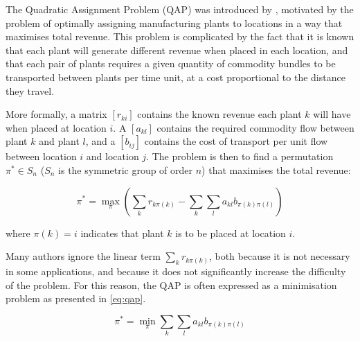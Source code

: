 
%


The Quadratic Assignment Problem (QAP) was introduced by \citet{Koopmans:1957gf}, motivated by the problem of optimally assigning manufacturing plants to locations in a way that maximises total revenue.
This problem is complicated by the fact that it is known that each plant will generate different revenue when placed in each location, and that each pair of plants requires a given quantity of commodity bundles to be transported between plants per time unit, at a cost proportional to the distance they travel.

More formally, a matrix \([r_{ki}]\) contains the known revenue each plant \(k\) will have when placed at location \(i\).
A  \([a_{kl}]\) contains the required commodity flow between plant \(k\) and plant \(l\), and a  \([b_{ij}]\) contains the cost of transport per unit flow between location \(i\) and location \(j\). %
The problem is then to find a permutation \(\pi^{*} \in S_n\) (\(S_n\) is the symmetric group of order \(n\)) that maximises the total revenue:

\[ \pi^{*} = \max_{\pi} \left(\sum_{k}{r_{k\pi(k)}} - \sum_{k}\sum_{l}{a_{kl}b_{\pi(k)\pi(l)}}\right) \]

where  \(\pi(k) = i\) indicates that plant \(k\) is to be placed at location \(i\).

Many authors ignore the linear term \(\sum_{k}{r_{k\pi(k)}}\), both because it is not necessary in some applications, and because it does not significantly increase the difficulty of the problem. For this reason, the QAP is often expressed as a minimisation problem as presented in \eqref{eq:qap}.

\begin{equation}
    \label{eq:qap}
    \pi^{*} = \min_{\pi} \sum_{k}\sum_{l}{a_{kl}b_{\pi(k)\pi(l)}}
\end{equation}

